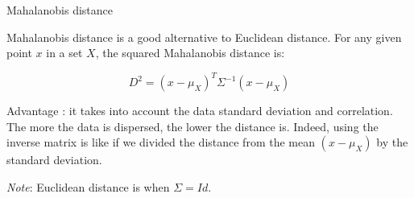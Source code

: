 Mahalanobis distance

Mahalanobis distance is a good alternative to Euclidean distance. For any given point $x$ in a set $X$, the squared Mahalanobis distance is:

$$D^2=(x-\mu_X)^T\Sigma^{-1}(x-\mu_X)$$

Advantage : it takes into account the data standard deviation and correlation. The more the data is dispersed, the lower the distance is. Indeed, using the inverse matrix is like if we divided the distance from the mean $(x-\mu_X)$ by the standard deviation.

\textit{Note}: Euclidean distance is when $\Sigma=Id$.

\vspace{5mm}
